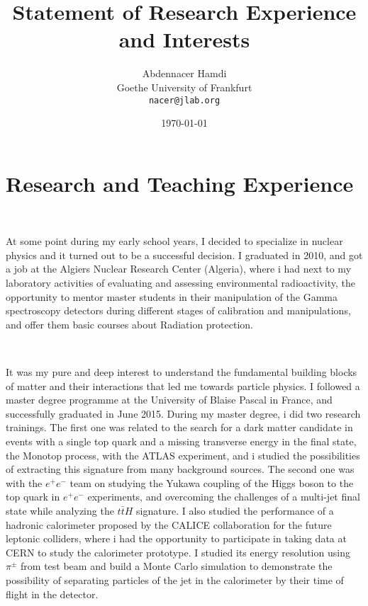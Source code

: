\documentclass[a4paper,roman]{article}
\title{Statement of Research Experience and Interests}
\author{Abdennacer Hamdi\\
Goethe University of Frankfurt\\
\texttt{nacer@jlab.org}}
\date{\today}
\begin{document}
\fontsize{12}{15}
\selectfont
\maketitle

\section*{Research and Teaching Experience}
~\par At some point during my early school years, I decided to specialize in nuclear physics and it turned out to be a successful decision. I graduated in 2010, and got a job at the Algiers Nuclear Research Center (Algeria), where i had next to my laboratory activities of evaluating and assessing environmental radioactivity, the opportunity to mentor master students in their manipulation of the Gamma spectroscopy detectors during different stages of calibration and manipulations, and offer them basic courses about Radiation protection.

~\par It was my pure and deep interest to understand the fundamental building blocks of matter and their interactions that led me towards particle physics. I followed a master degree programme at the University of Blaise Pascal in France, and successfully graduated in June 2015. During my master degree, i did two research trainings. The first one was related to the search for a dark matter candidate in events with a single top quark and a missing transverse energy in the final state, the Monotop process, with the ATLAS experiment, and i studied the possibilities of extracting this signature from many background sources. The second one was with the $e^+e^-$ team on studying the Yukawa coupling of the Higgs boson to the top quark in $e^+e^-$ experiments, and overcoming the challenges of a multi-jet final state while analyzing the $t\bar{t}H$ signature. I also studied the performance of a hadronic calorimeter proposed by the CALICE collaboration for the future leptonic colliders, where i had the opportunity to participate in taking data at CERN to study the calorimeter prototype. I studied its energy resolution using $\pi^{\pm}$ from test beam and build a Monte Carlo simulation to demonstrate the possibility of separating particles of the jet in the calorimeter by their time of flight in the detector.
\end{document}
